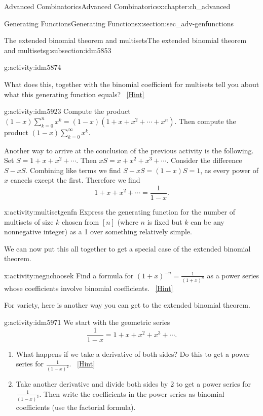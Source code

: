\documentclass[oneside,10pt,]{book}
\numberwithin{equation}{chapter}
\begin{document}
\begin{chapterptx}{Advanced Combinatorics}{}{Advanced Combinatorics}{}{}{x:chapter:ch_advanced}
\begin{sectionptx}{Generating Functions}{}{Generating Functions}{}{}{x:section:sec_adv-genfunctions}
\begin{subsectionptx}{The extended binomial theorem and multisets}{}{The extended binomial theorem and multisets}{}{}{g:subsection:idm5853}
\begin{activity}{}{g:activity:idm5874}
\begin{enumerate}[font=\bfseries,label=(\alph*),ref=\alph*]
What does this, together with the binomial coefficient for multisets tell you about what this generating function equals?%
\qquad~\hfill{\tiny\hyperlink{g:hint:idm5909-back}{[Hint]}}\end{enumerate}
\end{activity}
\begin{activity}{}{g:activity:idm5923}%
Compute the product \((1-x)\sum_{k=0}^n x^k = (1-x)(1+x+x^2+\cdots+x^n)\).  Then compute the product \((1-x)\sum_{k=0}^\infty x^k\).%
\end{activity}
Another way to arrive at the conclusion of the previous activity is the following.  Set \(S = 1 + x + x^2 + \cdots\).  Then \(xS = x + x^2 + x^3 + \cdots\).  Consider the difference \(S - xS\).  Combining like terms we find \(S-xS = (1-x)S = 1\), as every power of \(x\) cancels except the first.  Therefore we find%
\begin{equation*}
1 + x + x^2 + \cdots = \frac{1}{1-x}\text{.}
\end{equation*}
%
\begin{activity}{}{x:activity:multisetgenfn}%
Express the generating function for the number of multisets of size \(k\) chosen from \([n]\) (where \(n\) is fixed but \(k\) can be any nonnegative integer) as a 1 over something relatively simple.%
\end{activity}
We can now put this all together to get a special case of the extended binomial theorem.%
\begin{activity}{}{x:activity:negnchoosek}%
Find a formula for \((1+x)^{-n} = \frac{1}{(1+x)^n}\) as a power series whose coefficients involve binomial coefficients.%
\qquad~\hfill{\tiny\hyperlink{g:hint:idm5959-back}{[Hint]}}\end{activity}
For variety, here is another way you can get to the extended binomial theorem.%
\begin{activity}{}{g:activity:idm5971}%
We start with the geometric series%
\begin{equation*}
\frac{1}{1-x} = 1 + x + x^2 + x^3+ \cdots\text{.}
\end{equation*}
%
\begin{enumerate}[font=\bfseries,label=(\alph*),ref=\alph*]
\item{}What happens if we take a derivative of both sides?  Do this to get a power series for \(\frac{1}{(1-x)^2}\).%
\qquad~\hfill{\tiny\hyperlink{g:hint:idm5979-back}{[Hint]}}\item{}Take another derivative and divide both sides by 2 to get a power series for \(\frac{1}{(1-x)^3}\).  Then write the coefficients in the power series as binomial coefficients (use the factorial formula).%

\end{enumerate}
\end{activity}
\end{subsectionptx}
\end{sectionptx}
\end{chapterptx}
\end{document}
